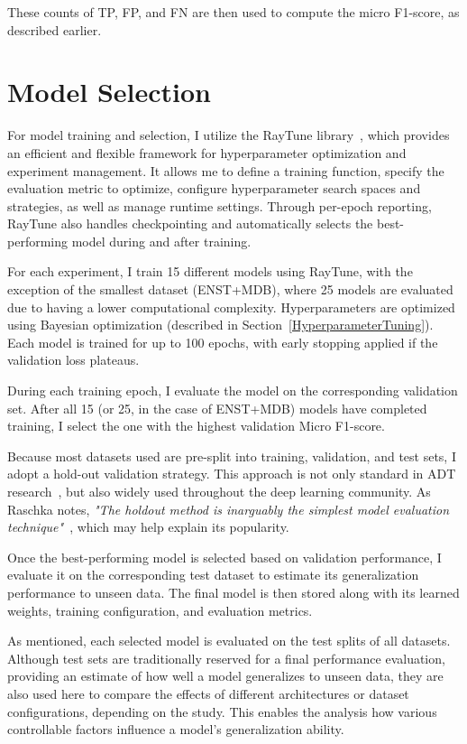 These counts of \acrshort{TP}, \acrshort{FP}, and \acrshort{FN} are then used to compute the micro F1-score, as described earlier.

\section{Model Selection}

For model training and selection, I utilize the RayTune library~\cite{liaw2018tuneresearchplatformdistributed}, which provides an efficient and flexible framework for hyperparameter optimization and experiment management. It allows me to define a training function, specify the evaluation metric to optimize, configure hyperparameter search spaces and strategies, as well as manage runtime settings. Through per-epoch reporting, RayTune also handles checkpointing and automatically selects the best-performing model during and after training.

For each experiment, I train 15 different models using RayTune, with the exception of the smallest dataset (ENST+MDB), where 25 models are evaluated due to having a lower computational complexity. Hyperparameters are optimized using Bayesian optimization (described in Section~\ref{HyperparameterTuning}). Each model is trained for up to 100 epochs, with early stopping applied if the validation loss plateaus. 

During each training epoch, I evaluate the model on the corresponding validation set. After all 15 (or 25, in the case of ENST+MDB) models have completed training, I select the one with the highest validation Micro F1-score. 

Because most datasets used are pre-split into training, validation, and test sets, I adopt a hold-out validation strategy. This approach is not only standard in \gls{ADT} research~\cite{vogl2016recurrent, 8350302, chang2024yourmt3+}, but also widely used throughout the deep learning community. As Raschka notes, \textit{"The holdout method is inarguably the simplest model evaluation technique"}~\cite{raschka2020modelevaluationmodelselection}, which may help explain its popularity.

Once the best-performing model is selected based on validation performance, I evaluate it on the corresponding test dataset to estimate its generalization performance to unseen data. The final model is then stored along with its learned weights, training configuration, and evaluation metrics.

As mentioned, each selected model is evaluated on the test splits of all datasets. Although test sets are traditionally reserved for a final performance evaluation, providing an estimate of how well a model generalizes to unseen data, they are also used here to compare the effects of different architectures or dataset configurations, depending on the study. This enables the analysis how various controllable factors influence a model's generalization ability. 


